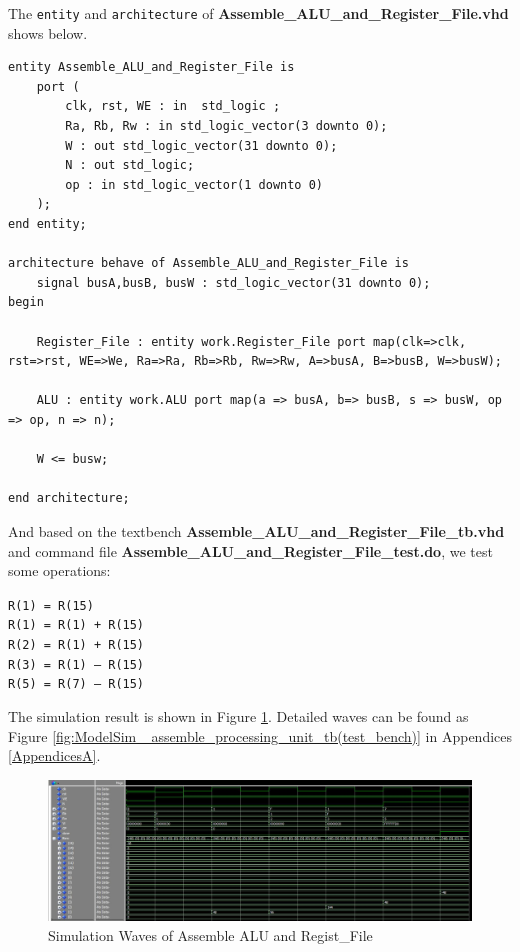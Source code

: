 The \texttt{entity} and \texttt{architecture} of \textbf{Assemble\_ALU\_and\_Register\_File.vhd} shows below.

\begin{lstlisting}[style=vhdl, breaklines]
entity Assemble_ALU_and_Register_File is 
    port (
        clk, rst, WE : in  std_logic ; 
        Ra, Rb, Rw : in std_logic_vector(3 downto 0);
        W : out std_logic_vector(31 downto 0);
        N : out std_logic; 
        op : in std_logic_vector(1 downto 0)
    );
end entity;
  
architecture behave of Assemble_ALU_and_Register_File is
    signal busA,busB, busW : std_logic_vector(31 downto 0);
begin
  
    Register_File : entity work.Register_File port map(clk=>clk, rst=>rst, WE=>We, Ra=>Ra, Rb=>Rb, Rw=>Rw, A=>busA, B=>busB, W=>busW); 

    ALU : entity work.ALU port map(a => busA, b=> busB, s => busW, op => op, n => n); 

    W <= busw; 
  
end architecture;
\end{lstlisting}

 And based on the textbench \textbf{Assemble\_ALU\_and\_Register\_File\_tb.vhd} and command file \textbf{Assemble\_ALU\_and\_Register\_File\_test.do}, we test some operations: 
\begin{center}
    \texttt{R(1) = R(15)} \\
    \texttt{R(1) = R(1) + R(15)}\\
    \texttt{R(2) = R(1) + R(15)}\\
    \texttt{R(3) = R(1) – R(15)}\\
    \texttt{R(5) = R(7) – R(15)} 
\end{center}

The simulation result is shown in Figure \ref{fig:AsmbALURFres}. Detailed waves can be found 
as Figure \ref{fig:ModelSim_ assemble_processing_unit_tb(test_bench)} in Appendices \ref{AppendicesA}.

\begin{figure}[htp]
    \centering
    \includegraphics[width=1\textwidth]{picture/AsmbALURFres.jpg}
    \caption{Simulation Waves of Assemble ALU and Regist\_File}     
    \label{fig:AsmbALURFres}
\end{figure}

